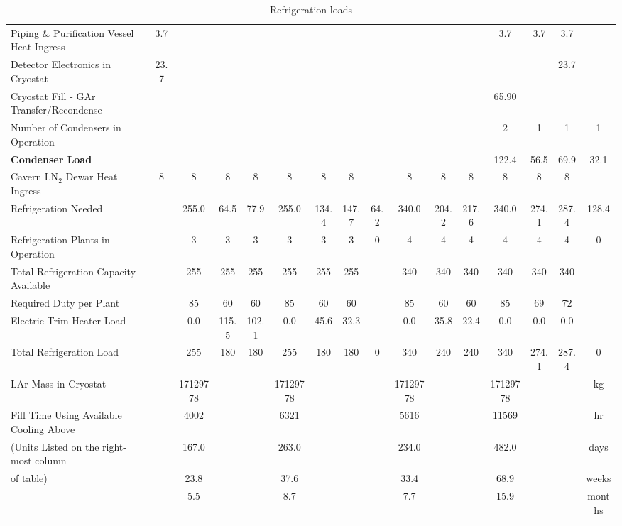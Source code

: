 \begin{table}
{\begin{tabular}[htbp]{|l|c|c|c|c|c|c|c|c||c|c|c|c|c|c|c|}
Piping \& Purification Vessel Heat Ingress & 3.7 &   &   &   &  &  &  &   & & & & 3.7 & 3.7 & 3.7 &      \\
Detector Electronics in Cryostat & 23.7 &   &   &   &   &   &  &   & & & & & & 23.7 &        \\
Cryostat Fill - GAr Transfer/Recondense &   &  & & &  & & & & & & & 65.90 & & &               \\
\hline
Number of Condensers in Operation & &  &  &  &  &  &  &  & & & & 2 & 1 & 1 & 1 \\
\textbf{Condenser Load} & &   &   &   &   &   &   &  & & & & 122.4 & 56.5 & 69.9 & 32.1 \\
Cavern LN$_2$ Dewar Heat Ingress & 8 & 8 & 8 & 8 & 8 & 8 & 8 & & 8 & 8 & 8 & 8 & 8 & 8 & \\
\hline\hline
Refrigeration Needed & & 255.0 & 64.5 & 77.9 & 255.0 & 134.4 & 147.7 & 64.2 & 340.0 & 204.2 & 217.6 & 340.0 & 274.1 & 287.4 & 128.4 \\
Refrigeration Plants in Operation & & 3 & 3 & 3 & 3 & 3 & 3 & 0 & 4 & 4 & 4 & 4 & 4 & 4 & 0 \\
Total Refrigeration Capacity Available & & 255 & 255 & 255 & 255 & 255 & 255 & & 340 & 340 & 340 & 340 & 340 & 340 & \\
Required Duty per Plant & & 85 & 60 & 60 & 85 & 60 & 60 & & 85 & 60 & 60 & 85 & 69 & 72 & \\
Electric Trim Heater Load & & 0.0 & 115.5 & 102.1 & 0.0 & 45.6 & 32.3 & & 0.0 & 35.8 & 22.4 & 0.0 & 0.0 & 0.0 & \\
Total Refrigeration Load & & 255 & 180 & 180 & 255 & 180 & 180 & 0 & 340 & 240 & 240 & 340 & 274.1 & 287.4 & 0 \\
\hline\hline
LAr Mass in Cryostat & & 17129778 & & & 17129778 & & & & 17129778 & & & 17129778 & & & kg \\
Fill Time Using Available Cooling Above & & 4002 & & & 6321 & & & & 5616 & & & 11569 & & & hr \\
(Units Listed on the right-most column & & 167.0 & & & 263.0 & & & & 234.0 & & & 482.0 & & & days \\
of table) & & 23.8 & & & 37.6 & & & & 33.4 & & & 68.9 & & & weeks \\ 
& & 5.5 & & & 8.7 & & & & 7.7 & & & 15.9 & & & months \\
\hline  
\end{tabular} 
}
\caption{Refrigeration loads}
\label{table:Refrigeration-loads}
\end{table}



